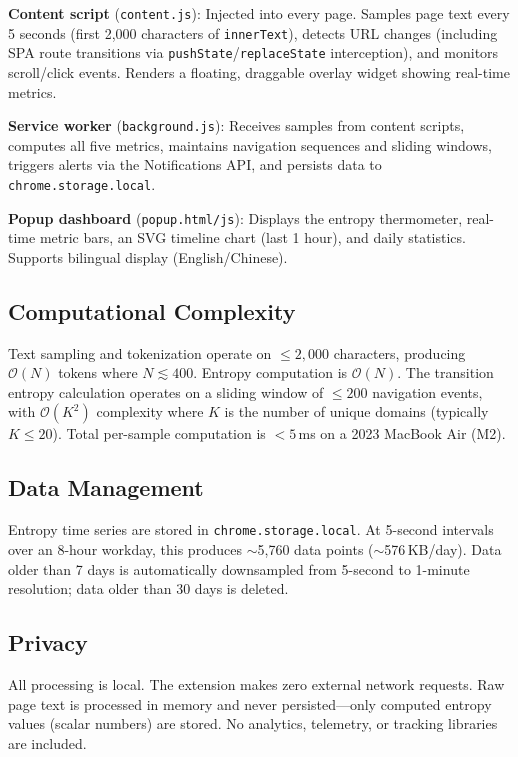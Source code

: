 \documentclass[10pt,letterpaper]{article}
\begin{document}
\textbf{Content script} (\texttt{content.js}): Injected into every page. Samples page text every 5 seconds (first 2,000 characters of \texttt{innerText}), detects URL changes (including SPA route transitions via \texttt{pushState}/\texttt{replaceState} interception), and monitors scroll/click events. Renders a floating, draggable overlay widget showing real-time metrics.

\textbf{Service worker} (\texttt{background.js}): Receives samples from content scripts, computes all five metrics, maintains navigation sequences and sliding windows, triggers alerts via the Notifications API, and persists data to \texttt{chrome.storage.local}.

\textbf{Popup dashboard} (\texttt{popup.html/js}): Displays the entropy thermometer, real-time metric bars, an SVG timeline chart (last 1 hour), and daily statistics. Supports bilingual display (English/Chinese).

\subsection{Computational Complexity}

Text sampling and tokenization operate on $\leq 2{,}000$ characters, producing $\mathcal{O}(N)$ tokens where $N \lesssim 400$. Entropy computation is $\mathcal{O}(N)$. The transition entropy calculation operates on a sliding window of $\leq 200$ navigation events, with $\mathcal{O}(K^2)$ complexity where $K$ is the number of unique domains (typically $K \leq 20$). Total per-sample computation is $< 5$\,ms on a 2023 MacBook Air (M2).

\subsection{Data Management}

Entropy time series are stored in \texttt{chrome.storage.local}. At 5-second intervals over an 8-hour workday, this produces $\sim$5,760 data points ($\sim$576\,KB/day). Data older than 7 days is automatically downsampled from 5-second to 1-minute resolution; data older than 30 days is deleted.

\subsection{Privacy}

All processing is local. The extension makes zero external network requests. Raw page text is processed in memory and never persisted---only computed entropy values (scalar numbers) are stored. No analytics, telemetry, or tracking libraries are included.
\end{document}
